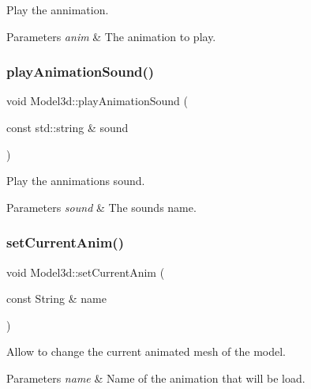 Play the annimation. 


\begin{DoxyParams}{Parameters}
{\em anim} & The animation to play. \\
\hline
\end{DoxyParams}
\mbox{\label{classModel3d_a6ce79286c43bd4a6852c544bdad8ee18}} 
\subsubsection{\texorpdfstring{play\+Animation\+Sound()}{playAnimationSound()}}
{\footnotesize\ttfamily void Model3d\+::play\+Animation\+Sound (\begin{DoxyParamCaption}\item[{const std\+::string \&}]{sound }\end{DoxyParamCaption})}



Play the annimation\textquotesingle{}s sound. 


\begin{DoxyParams}{Parameters}
{\em sound} & The sound\textquotesingle{}s name. \\
\hline
\end{DoxyParams}
\mbox{\label{classModel3d_a29eeaa6769b0c21268f4704ac2d404b7}} 
\subsubsection{\texorpdfstring{set\+Current\+Anim()}{setCurrentAnim()}}
{\footnotesize\ttfamily void Model3d\+::set\+Current\+Anim (\begin{DoxyParamCaption}\item[{const String \&}]{name }\end{DoxyParamCaption})}



Allow to change the current animated mesh of the model. 


\begin{DoxyParams}{Parameters}
{\em name} & Name of the animation that will be load. \\
\hline
\end{DoxyParams}
\mbox{\label{classModel3d_a971b77ce978903443e71187ceafa1528}} 
